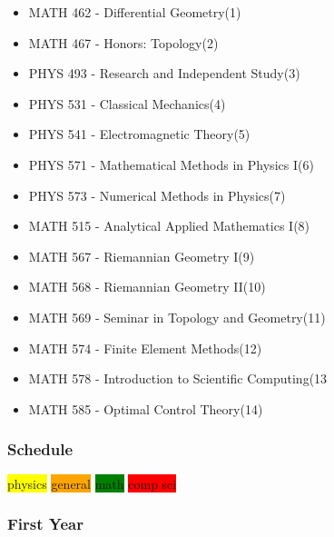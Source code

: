 \begin{itemize}
    \item MATH 462 - Differential Geometry(1)
  	\item MATH 467 - Honors: Topology(2)
    \item PHYS 493 - Research and Independent Study(3)
    \item PHYS 531 - Classical Mechanics(4)
    \item PHYS 541 - Electromagnetic Theory(5)
    \item PHYS 571 - Mathematical Methods in Physics I(6)
    \item PHYS 573 - Numerical Methods in Physics(7)
    \item MATH 515 - Analytical Applied Mathematics I(8)
    \item MATH 567 - Riemannian Geometry I(9)
    \item MATH 568 - Riemannian Geometry II(10)
    \item MATH 569 - Seminar in Topology and Geometry(11)
    \item MATH 574 - Finite Element Methods(12)
    \item MATH 578 - Introduction to Scientific Computing(13
    \item MATH 585 - Optimal Control Theory(14)
\end{itemize}
\subsubsection{Schedule}
\colorbox{yellow}{physics}
\colorbox{orange}{general}
\colorbox{green}{math}
\colorbox{red}{comp sci}
\subsubsection{First Year}
